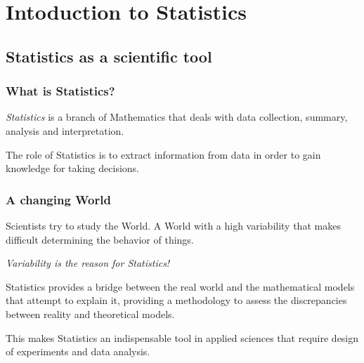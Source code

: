 \section{Intoduction to Statistics}



\subsection{Statistics as a scientific tool}
\begin{frame}
\frametitle{What is Statistics?}
\begin{definition}[Statistics]
\emph{Statistics} is a branch of Mathematics that deals with data collection, summary, analysis and interpretation.
\end{definition}

The role of Statistics is to extract information from data in order to gain knowledge for taking decisions.

\begin{center}
\resizebox{\textwidth}{!}{

}
\end{center}


\end{frame}


\begin{frame}
\frametitle{A changing World}
Scientists try to study the World. A World with a high variability that makes difficult determining the behavior of
things.

\begin{center}
\alert{\emph{Variability is the reason for Statistics!}}
\end{center}

Statistics provides a bridge between the real world and the mathematical models that attempt to
explain it, providing a methodology to assess the discrepancies between reality and theoretical models.

This makes Statistics an indispensable tool in applied sciences that require design of experiments and data analysis.
\end{frame}



